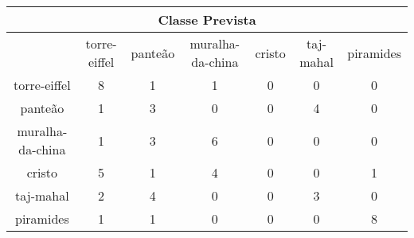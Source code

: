 \begin{tabular}{|c|c|c|c|c|c|c|}
\hline
\multicolumn{7}{|c|}{Classe Prevista}\\
\hline
 & torre-eiffel & panteão & muralha-da-china & cristo & taj-mahal & piramides\\
torre-eiffel & 8 & 1 & 1 & 0 & 0 & 0\\
panteão & 1 & 3 & 0 & 0 & 4 & 0\\
muralha-da-china & 1 & 3 & 6 & 0 & 0 & 0\\
cristo & 5 & 1 & 4 & 0 & 0 & 1\\
taj-mahal & 2 & 4 & 0 & 0 & 3 & 0\\
piramides & 1 & 1 & 0 & 0 & 0 & 8\\
\hline
\end{tabular}
